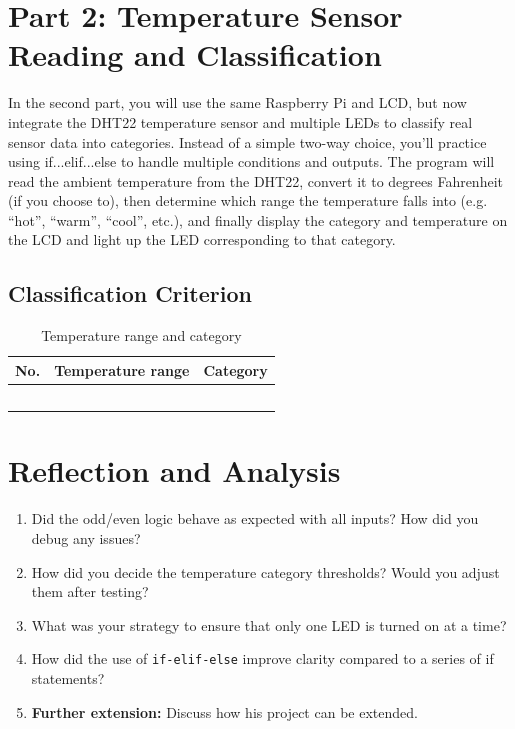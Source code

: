 \documentclass[a4paper,11pt]{article}
\begin{document}
\newpage
\section*{Part 2: Temperature Sensor Reading and Classification }
In the second part, you will use the same Raspberry Pi and LCD, 
but now integrate the DHT22 temperature sensor and multiple LEDs 
to classify real sensor data into categories. Instead of a simple 
two-way choice, you'll practice using if...elif...else to handle multiple 
conditions and outputs. The program will read the ambient temperature from 
the DHT22, convert it to degrees Fahrenheit (if you choose to), then 
determine which range the temperature falls into (e.g. “hot”, “warm”, “cool”, etc.), 
and finally display the category and temperature on the LCD and light 
up the LED corresponding to that category.


\subsection*{Classification Criterion}

\begin{table}[ht]
  \centering
  \renewcommand{\arraystretch}{1.5}
  \begin{tabular}{|p{1cm}|c|p{4cm}|}
    \hline
    \textbf{No.} & \textbf{Temperature range} & \textbf{Category} \\ \hline
     &  &  \\ \hline
     &  &  \\ \hline
     &  &  \\ \hline
     &  &  \\ \hline
     &  &  \\ \hline
  \end{tabular}
  \caption{Temperature range and category}
  \label{tab:category}
\end{table}

\newpage
\section*{Reflection and Analysis}
\begin{enumerate}
    \item Did the odd/even logic behave as expected with all inputs? How did you debug any issues?
    \item How did you decide the temperature category thresholds? Would you adjust them after testing?

    \item What was your strategy to ensure that only one LED is turned on at a time?
    \item How did the use of \texttt{if-elif-else} improve clarity compared to a series of if statements?

    \item \textbf{Further extension:} Discuss how his project can be extended.

\end{enumerate}
\end{document}
